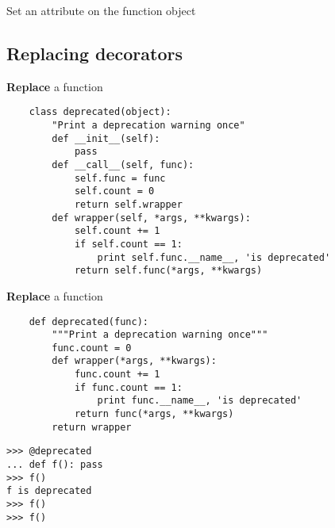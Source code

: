 \documentclass{beamer}
\begin{document}
\begin{frame}[fragile]{Set an attribute on the function object}
\end{frame}

\subsection{Replacing decorators}

\begin{frame}[fragile]{\textbf{Replace} a function}
  \begin{verbatim}
    class deprecated(object):
        "Print a deprecation warning once"
        def __init__(self):
            pass
        def __call__(self, func):
            self.func = func
            self.count = 0
            return self.wrapper
        def wrapper(self, *args, **kwargs):
            self.count += 1
            if self.count == 1:
                print self.func.__name__, 'is deprecated'
            return self.func(*args, **kwargs)
  \end{verbatim}
\end{frame}

\begin{frame}[fragile]{\textbf{Replace} a function}
  \begin{verbatim}
    def deprecated(func):
        """Print a deprecation warning once"""
        func.count = 0
        def wrapper(*args, **kwargs):
            func.count += 1
            if func.count == 1:
                print func.__name__, 'is deprecated'
            return func(*args, **kwargs)
        return wrapper
  \end{verbatim}
  \begin{verbatim}
>>> @deprecated
... def f(): pass
>>> f()
f is deprecated
>>> f()
>>> f()
  \end{verbatim}
\end{frame}
\end{document}
